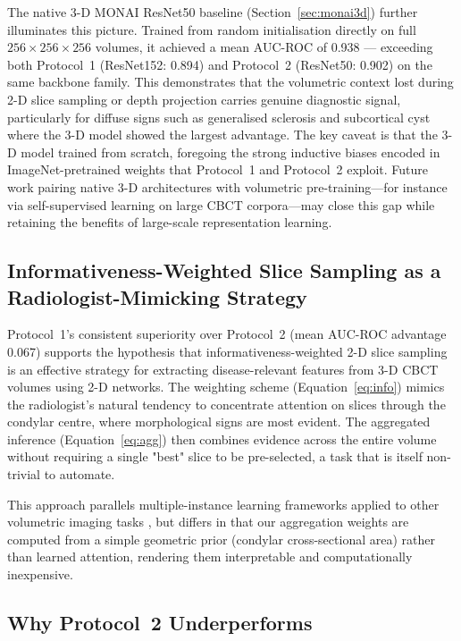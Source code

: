 \documentclass[review,12pt]{elsarticle}
\begin{document}
The native 3-D MONAI ResNet50 baseline (Section~\ref{sec:monai3d})
further illuminates this picture. Trained from random initialisation
directly on full $256 \times 256 \times 256$ volumes, it achieved a
mean AUC-ROC of 0.938 --- exceeding both Protocol~1 (ResNet152: 0.894)
and Protocol~2 (ResNet50: 0.902) on the same backbone family. This
demonstrates that the volumetric context lost during 2-D slice sampling
or depth projection carries genuine diagnostic signal, particularly for
diffuse signs such as generalised sclerosis and subcortical cyst where
the 3-D model showed the largest advantage. The key caveat is that
the 3-D model trained from scratch, foregoing the strong inductive
biases encoded in ImageNet-pretrained weights that Protocol~1 and
Protocol~2 exploit. Future work pairing native 3-D architectures with
volumetric pre-training---for instance via self-supervised learning on
large CBCT corpora---may close this gap while retaining the benefits
of large-scale representation learning.

\subsection{Informativeness-Weighted Slice Sampling as a Radiologist-Mimicking Strategy}

Protocol~1's consistent superiority over Protocol~2 (mean AUC-ROC
advantage 0.067) supports the hypothesis that informativeness-weighted
2-D slice sampling is an effective strategy for extracting
disease-relevant features from 3-D CBCT volumes using 2-D networks.
The weighting scheme (Equation~\ref{eq:info}) mimics the radiologist's
natural tendency to concentrate attention on slices through the condylar
centre, where morphological signs are most evident. The aggregated
inference (Equation~\ref{eq:agg}) then combines evidence across the
entire volume without requiring a single "best" slice to be
pre-selected, a task that is itself non-trivial to automate.

This approach parallels multiple-instance learning frameworks applied
to other volumetric imaging tasks \cite{ilse2018attention,campanella2019clinical}, but
differs in that our aggregation weights are computed from a simple
geometric prior (condylar cross-sectional area) rather than learned
attention, rendering them interpretable and computationally inexpensive.

\subsection{Why Protocol~2 Underperforms}
\end{document}
